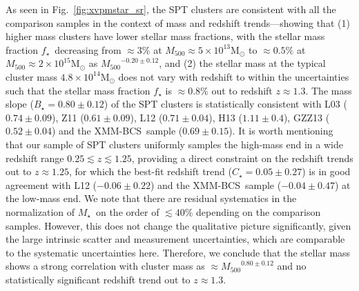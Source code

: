 \documentclass[useAMS,usenatbib,iop,numberedappendix]{mn2e}
\newcommand{\Msun}{\ensuremath{\mathrm{M}_{\odot}}}
\newcommand{\Mfiveoo}{\ensuremath{M_{500}}}
\newcommand{\redshift}{\ensuremath{z}}
\newcommand{\XMMBCS}{XMM-BCS}
\newcommand{\Mstar}{\ensuremath{M_{\star}}}
\newcommand{\Bstar}{\ensuremath{B_{\star}}}
\newcommand{\Cstar}{\ensuremath{C_{\star}}}
\newcommand{\fstar}{\ensuremath{f_{\star}}}
\newcommand{\percent}{\ensuremath{\%}}
\newcommand{\numBstaronezsys}{\ensuremath{0.80\pm0.12}}
\newcommand{\numCstaronezsys}{\ensuremath{0.05\pm0.27}}
\begin{document}
As seen in Fig.~\ref{fig:xvpmstar_sr}, the SPT clusters are consistent with all the comparison samples in the context of mass and redshift trends---showing that (1) 
higher mass clusters have lower stellar mass fractions,
with the stellar mass fraction \fstar\ decreasing from $\approx3\percent$ at $\Mfiveoo\approx5\times10^{13}\Msun$ to $\approx0.5\percent$ at $\Mfiveoo\approx2\times10^{15}\Msun$ as ${\Mfiveoo}^{-0.20\pm0.12}$, and (2) the stellar mass at the 
typical cluster mass $4.8\times10^{14}\Msun$ does not vary with redshift to within the uncertainties such that the stellar mass fraction $\fstar$ is $\approx0.8\percent$ out to redshift $\redshift\approx1.3$.
The mass slope ($\Bstar=\numBstaronezsys$) of the SPT clusters is statistically consistent with L03 ($0.74\pm0.09$), Z11 ($0.61\pm0.09$), L12 ($0.71\pm0.04$), H13 ($1.11\pm0.4$), GZZ13 ($0.52\pm0.04$) and the \XMMBCS\ sample ($0.69\pm0.15$).
It is worth mentioning that our sample of SPT clusters uniformly samples the high-mass end in a wide redshift range $0.25\lesssim\redshift\lesssim1.25$, providing a direct constraint on the redshift trends out to $\redshift\approx1.25$, for which the best-fit redshift trend ($\Cstar=\numCstaronezsys$) is in good agreement with L12 ($-0.06\pm0.22$) and the \XMMBCS\ sample ($-0.04\pm0.47$) at the low-mass end.
We note that there are residual systematics in the normalization of \Mstar\ on the order of $\lesssim40\percent$ depending on the comparison samples.
However, this does not change the qualitative picture significantly, given the large intrinsic scatter and measurement uncertainties, which are comparable to the systematic uncertainties here.
Therefore, we conclude that the stellar mass shows a strong correlation with cluster mass as $\approx{\Mfiveoo}^{\numBstaronezsys}$ and no statistically significant redshift trend out to $\redshift\approx1.3$.
\end{document}

